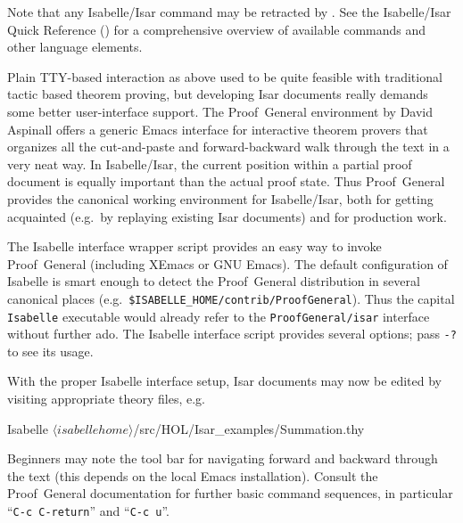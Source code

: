 \begin{isabellebody}
\begin{isamarkuptext}
  Note that any Isabelle/Isar command may be retracted by \hyperlink{command.undo}{\mbox{}}.  See the Isabelle/Isar Quick Reference
  () for a comprehensive overview of available
  commands and other language elements.%
\end{isamarkuptext}%
\isamarkuptrue%
%
\isamarkuptrue%
%
\begin{isamarkuptext}%
Plain TTY-based interaction as above used to be quite feasible with
  traditional tactic based theorem proving, but developing Isar
  documents really demands some better user-interface support.  The
  Proof~General environment by David Aspinall
  \cite{proofgeneral,Aspinall:TACAS:2000} offers a generic Emacs
  interface for interactive theorem provers that organizes all the
  cut-and-paste and forward-backward walk through the text in a very
  neat way.  In Isabelle/Isar, the current position within a partial
  proof document is equally important than the actual proof state.
  Thus Proof~General provides the canonical working environment for
  Isabelle/Isar, both for getting acquainted (e.g.\ by replaying
  existing Isar documents) and for production work.%
\end{isamarkuptext}%
\isamarkuptrue%
%
\isamarkuptrue%
%
\begin{isamarkuptext}%
The Isabelle interface wrapper script provides an easy way to invoke
  Proof~General (including XEmacs or GNU Emacs).  The default
  configuration of Isabelle is smart enough to detect the
  Proof~General distribution in several canonical places (e.g.\
  \verb|$ISABELLE_HOME/contrib/ProofGeneral|).  Thus the
  capital \verb|Isabelle| executable would already refer to the
  \verb|ProofGeneral/isar| interface without further ado.  The
  Isabelle interface script provides several options; pass \verb|-?|  to see its usage.

  With the proper Isabelle interface setup, Isar documents may now be edited by
  visiting appropriate theory files, e.g.\ 
\begin{ttbox}
Isabelle \({\langle}isabellehome{\rangle}\)/src/HOL/Isar_examples/Summation.thy
\end{ttbox}
  Beginners may note the tool bar for navigating forward and backward
  through the text (this depends on the local Emacs installation).
  Consult the Proof~General documentation \cite{proofgeneral} for
  further basic command sequences, in particular ``\verb|C-c C-return|''
  and ``\verb|C-c u|''.


\end{isamarkuptext}
\end{isabellebody}
